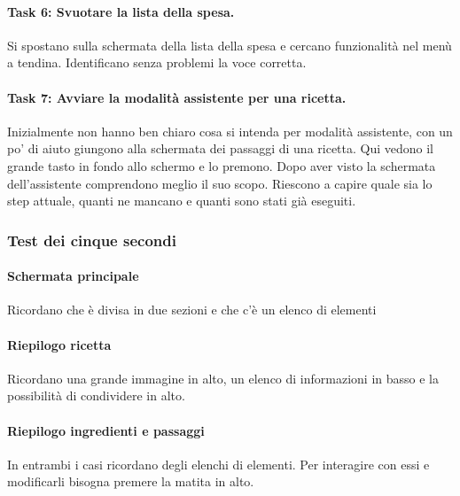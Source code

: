 \paragraph{Task 6: Svuotare la lista della spesa.}
Si spostano sulla schermata della lista della spesa e cercano funzionalità nel menù a tendina.
Identificano senza problemi la voce corretta.

\paragraph{Task 7: Avviare la modalità assistente per una ricetta.}
Inizialmente non hanno ben chiaro cosa si intenda per modalità assistente, con un po' di aiuto giungono alla schermata dei passaggi di una ricetta.
Qui vedono il grande tasto in fondo allo schermo e lo premono.
Dopo aver visto la schermata dell'assistente comprendono meglio il suo scopo.
Riescono a capire quale sia lo step attuale, quanti ne mancano e quanti sono stati già eseguiti.

\clearpage
\subsubsection{Test dei cinque secondi}
\paragraph{Schermata principale}
Ricordano che è divisa in due sezioni e che c'è un elenco di elementi

\paragraph{Riepilogo ricetta}
Ricordano una grande immagine in alto, un elenco di informazioni in basso e la possibilità di condividere in alto.

\paragraph{Riepilogo ingredienti e passaggi}
In entrambi i casi ricordano degli elenchi di elementi.
Per interagire con essi e modificarli bisogna premere la matita in alto.
